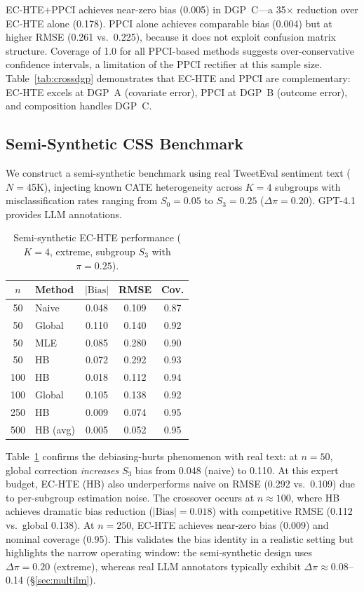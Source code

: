 \documentclass[11pt,twocolumn]{article}
\begin{document}
EC-HTE+PPCI achieves near-zero bias (0.005) in DGP~C---a 35$\times$ reduction over EC-HTE alone (0.178). PPCI alone achieves comparable bias (0.004) but at higher RMSE (0.261 vs.\ 0.225), because it does not exploit confusion matrix structure. Coverage of 1.0 for all PPCI-based methods suggests over-conservative confidence intervals, a limitation of the PPCI rectifier at this sample size. Table~\ref{tab:crossdgp} demonstrates that EC-HTE and PPCI are complementary: EC-HTE excels at DGP~A (covariate error), PPCI at DGP~B (outcome error), and composition handles DGP~C.

\subsection{Semi-Synthetic CSS Benchmark}
\label{sec:semisyn}

We construct a semi-synthetic benchmark using real TweetEval sentiment text ($N{=}$45K), injecting known CATE heterogeneity across $K{=}4$ subgroups with misclassification rates ranging from $S_0{=}0.05$ to $S_3{=}0.25$ ($\Delta\pi{=}0.20$). GPT-4.1 provides LLM annotations.

\begin{table}[t]
\centering
\small
\caption{Semi-synthetic EC-HTE performance ($K{=}4$, extreme, subgroup $S_3$ with $\pi{=}0.25$).}
\label{tab:semisyn}
\begin{tabular}{@{}clccc@{}}
\toprule
$n$ & Method & $|\text{Bias}|$ & RMSE & Cov. \\
\midrule
50 & Naive & 0.048 & 0.109 & 0.87 \\
50 & Global & 0.110 & 0.140 & 0.92 \\
50 & MLE & 0.085 & 0.280 & 0.90 \\
50 & HB & 0.072 & 0.292 & 0.93 \\
\midrule
100 & HB & 0.018 & 0.112 & 0.94 \\
100 & Global & 0.105 & 0.138 & 0.92 \\
\midrule
250 & HB & 0.009 & 0.074 & 0.95 \\
500 & HB (avg) & 0.005 & 0.052 & 0.95 \\
\bottomrule
\end{tabular}
\end{table}

Table~\ref{tab:semisyn} confirms the debiasing-hurts phenomenon with real text: at $n{=}50$, global correction \emph{increases} $S_3$ bias from 0.048 (naive) to 0.110. At this expert budget, EC-HTE (HB) also underperforms naive on RMSE (0.292 vs.\ 0.109) due to per-subgroup estimation noise. The crossover occurs at $n \approx 100$, where HB achieves dramatic bias reduction ($|\text{Bias}|{=}0.018$) with competitive RMSE (0.112 vs.\ global 0.138). At $n{=}250$, EC-HTE achieves near-zero bias (0.009) and nominal coverage (0.95). This validates the bias identity in a realistic setting but highlights the narrow operating window: the semi-synthetic design uses $\Delta\pi{=}0.20$ (extreme), whereas real LLM annotators typically exhibit $\Delta\pi \approx 0.08$--0.14 (\S\ref{sec:multilm}).
\end{document}
